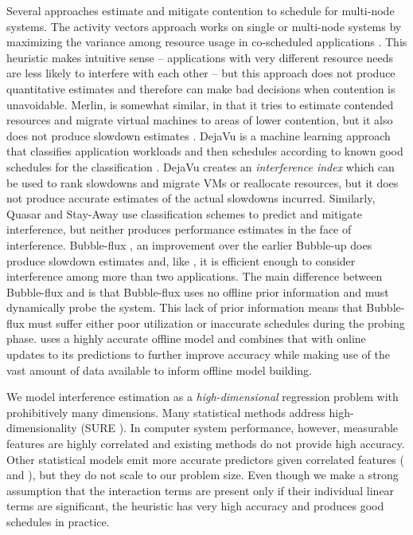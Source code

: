 Several approaches estimate and mitigate contention to schedule for
multi-node systems.  The activity vectors approach works on single or
multi-node systems by maximizing the variance among resource usage in
co-scheduled applications \cite{merkel2010resource}.  This heuristic
makes intuitive sense -- applications with very different resource
needs are less likely to interfere with each other -- but this
approach does not produce quantitative estimates and therefore can
make bad decisions when contention is unavoidable.  Merlin, is
somewhat similar, in that it tries to estimate contended resources and
migrate virtual machines to areas of lower contention, but it also
does not produce slowdown estimates \cite{Merlin}.  DejaVu is a
machine learning approach that classifies application workloads and
then schedules according to known good schedules for the
classification \cite{dejavu}. DejaVu creates an \emph{interference
  index} which can be used to rank slowdowns and migrate VMs or
reallocate resources, but it does not produce accurate estimates of
the actual slowdowns incurred.  Similarly, Quasar \cite{quasar} and
Stay-Away \cite{stay-away} use classification schemes to predict and
mitigate interference, but neither produces performance estimates in
the face of interference.  Bubble-flux \cite{Bubble-flux}, an
improvement over the earlier Bubble-up \cite{Bubble-up} does produce
slowdown estimates and, like \SYSTEMESP{}, it is efficient enough to
consider interference among more than two applications.  The main
difference between Bubble-flux and \SYSTEMESP{} is that Bubble-flux uses
no offline prior information and must dynamically probe the system.
This lack of prior information means that Bubble-flux must suffer
either poor utilization or inaccurate schedules during the probing
phase.  \SYSTEMESP{} uses a highly accurate offline model and combines
that with online updates to its predictions to further improve
accuracy while making use of the vast amount of data available to
inform offline model building.

We model interference estimation as a \emph{high-dimensional}
regression problem with prohibitively many dimensions.  Many
statistical methods address high-dimensionality (\eg SURE
\cite{fan2008sure}). In computer system performance, however,
measurable features are highly correlated and existing methods do not
provide high accuracy.  Other statistical models emit more accurate
predictors given correlated features (\eg \cite{yuan2006model} and
\cite{bien2013lasso}), but they do not scale to our problem size.
Even though we make a strong assumption that the interaction terms are
present only if their individual linear terms are significant, the
heuristic has very high accuracy and produces good schedules in
practice.
